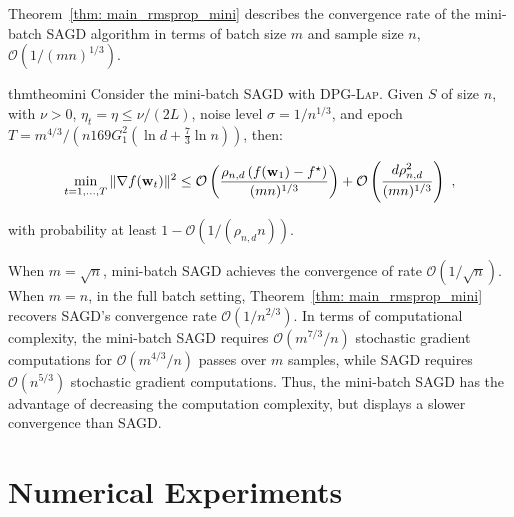\documentclass[11pt]{article}
\begin{document}
Theorem~\ref{thm: main_rmsprop_mini} 
describes the convergence rate of the mini-batch \textsc{SAGD} algorithm in terms of batch size $m$ and sample size $n$, \ie $\mathcal{O}(1/(mn)^{1/3})$.
\begin{restatable}{thm}{theomini}
\label{thm: main_rmsprop_mini}
Consider the mini-batch \textsc{SAGD} with \textsc{DPG-Lap}. 
Given $S$ of size $n$, with $\nu >0$, $\eta_t = \eta \leq \nu/(2L)$, noise level $\sigma = 1/n^{1/3}$, and epoch $T = m^{4/3}/\left(n169G_1^2(\ln d + \frac{7}{3}\ln n)\right)$, then:
 \begin{small}
\begin{equation*}
\begin{split}
 \min_{t = 1,..., T}\|\nabla f(\mathbf{w}_t)\|^2 
 \leq\mathcal{O} \left( \frac{\rho_{n,d} \left(f(\mathbf{w}_1) - f^\star \right)}{(mn)^{1/3}} \right)+\mathcal{O} \left( \frac{d \rho_{n,d}^2}{(mn)^{1/3}}\right)~,
 \end{split}
\end{equation*}
\end{small}
with probability at least $1-\mathcal{O} \left(1/(\rho_{n,d} n)\right)$.
\end{restatable}
When $m = \sqrt{n}$, mini-batch \textsc{SAGD} achieves the convergence of rate $\mathcal{O}(1/\sqrt{n})$. When $m=n$, \ie in the full batch setting, Theorem~\ref{thm: main_rmsprop_mini} recovers \textsc{SAGD}'s convergence rate  $\mathcal{O}(1/n^{2/3})$. 
In terms of computational complexity, the mini-batch \textsc{SAGD} requires $\mathcal{O}(m^{7/3}/n)$ stochastic gradient computations for $\mathcal{O}(m^{4/3}/n)$ passes over $m$ samples, while \textsc{SAGD} requires $\mathcal{O}(n^{5/3})$ stochastic gradient computations. 
Thus, the mini-batch \textsc{SAGD} has the advantage of decreasing the computation complexity, but displays a slower convergence than \textsc{SAGD}.


\section{Numerical Experiments} \label{sec: experiment}
\end{document}
